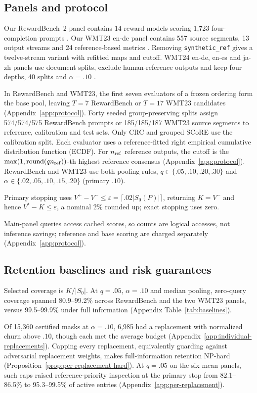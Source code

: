 \documentclass[11pt]{article}
\begin{document}
\subsection{Panels and protocol}
Our RewardBench~2 panel contains 14 reward models scoring 1,723 four-completion prompts \citep{malik2026rewardbench2}. Our WMT23 en-de panel contains 557 source segments, 13 output streams and 24 reference-based metrics \citep{freitag2023wmt23}. Removing \texttt{synthetic\_ref} gives a twelve-stream variant with refitted maps and cutoff. WMT24 en-de, en-es and ja-zh panels use document splits, exclude human-reference outputs and keep four depths, 40 splits and $\alpha=.10$ \citep{freitag2024wmt24}.

In RewardBench and WMT23, the first seven evaluators of a frozen ordering form the base pool, leaving $T=7$ RewardBench or $T=17$ WMT23 candidates (Appendix~\ref{app:protocol}). Forty seeded group-preserving splits assign 574/574/575 RewardBench prompts or 185/185/187 WMT23 source segments to reference, calibration and test sets. Only CRC and grouped SCoRE use the calibration split. Each evaluator uses a reference-fitted right empirical cumulative distribution function (ECDF). For $n_{\rm ref}$ reference outputs, the cutoff is the $\max(1,\operatorname{round}(qn_{\rm ref}))$-th highest reference consensus (Appendix~\ref{app:protocol}). RewardBench and WMT23 use both pooling rules, $q\in\{.05,.10,.20,.30\}$ and $\alpha\in\{.02,.05,.10,.15,.20\}$ (primary $.10$).

Primary stopping uses $V^+-V^-\le\varepsilon=\lceil.02|S_0(P)|\rceil$, returning $K=V^-$ and hence $V^*-K\le\varepsilon$, a nominal 2\% rounded up; exact stopping uses zero.

Main-panel queries access cached scores, so counts are logical accesses, not inference savings; reference and base scoring are charged separately (Appendix~\ref{app:protocol}).

\subsection{Retention baselines and risk guarantees}
Selected coverage is $K/|S_0|$. At $q=.05$, $\alpha=.10$ and median pooling, zero-query coverage spanned 80.9--99.2\% across RewardBench and the two WMT23 panels, versus 99.5--99.9\% under full information (Appendix Table~\ref{tab:baselines}).

Of 15,360 certified masks at $\alpha=.10$, 6,985 had a replacement with normalized churn above $.10$, though each met the average budget (Appendix~\ref{app:individual-replacements}). Capping every replacement, equivalently guarding against adversarial replacement weights, makes full-information retention NP-hard (Proposition~\ref{prop:per-replacement-hard}). At $q=.05$ on the six mean panels, such caps raised reference-priority inspection at the primary stop from 82.1--86.5\% to 95.3--99.5\% of active entries (Appendix~\ref{app:per-replacement}).
\end{document}
